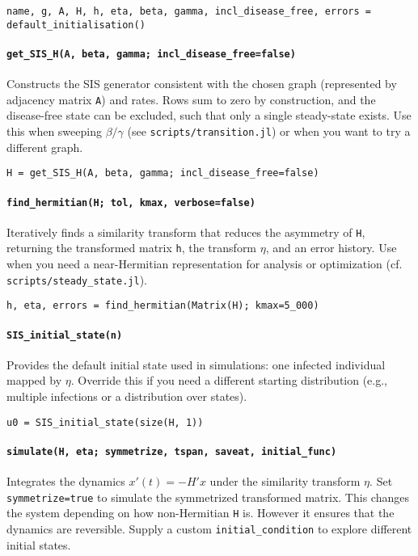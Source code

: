 \documentclass[11pt]{article}
\newcommand{\code}[1]{\texttt{#1}}
\begin{document}
\begin{Verbatim}[fontsize=\small]
name, g, A, H, h, eta, beta, gamma, incl_disease_free, errors = default_initialisation()
\end{Verbatim}

\paragraph{\code{get\_SIS\_H(A, beta, gamma; incl\_disease\_free=false)}} Constructs the SIS generator consistent with the chosen graph (represented by adjacency matrix \code{A}) and rates.
Rows sum to zero by construction, and the disease-free state can be excluded, such that only a single steady-state exists.
Use this when sweeping \(\beta/\gamma\) (see \code{scripts/transition.jl}) or when you want to try a different graph.

\begin{Verbatim}[fontsize=\small]
H = get_SIS_H(A, beta, gamma; incl_disease_free=false)
\end{Verbatim}

\paragraph{\code{find\_hermitian(H; tol, kmax, verbose=false)}} Iteratively finds a similarity transform that reduces the asymmetry of \code{H}, returning the transformed matrix \code{h}, the transform \(\eta\), and an error history.
Use when you need a near-Hermitian representation for analysis or optimization (cf. \code{scripts/steady\_state.jl}).

\begin{Verbatim}[fontsize=\small]
h, eta, errors = find_hermitian(Matrix(H); kmax=5_000)
\end{Verbatim}

\paragraph{\code{SIS\_initial\_state(n)}} Provides the default initial state used in simulations: one infected individual mapped by \(\eta\).
Override this if you need a different starting distribution (e.g., multiple infections or a distribution over states).

\begin{Verbatim}[fontsize=\small]
u0 = SIS_initial_state(size(H, 1))
\end{Verbatim}

\paragraph{\code{simulate(H, eta; symmetrize, tspan, saveat, initial\_func)}} Integrates the dynamics \(x'(t) = -H' x\) under the similarity transform \(\eta\).
Set \code{symmetrize=true} to simulate the symmetrized transformed matrix.
This changes the system depending on how non-Hermitian \code{H} is.
However it ensures that the dynamics are reversible.
Supply a custom \code{initial\_condition} to explore different initial states.
\end{document}
